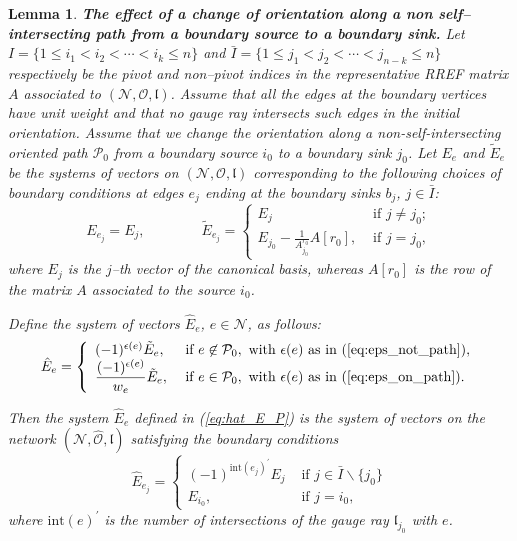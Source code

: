 \documentclass[11pt]{amsart}
\theoremstyle{plain}
\numberwithin{equation}{section}
\newtheorem{lemma}[theorem]{Lemma}
\begin{document}
\begin{lemma}\label{lemma:path}\textbf{The effect of a change of orientation along a non self--intersecting path from a boundary source to a boundary sink.}
Let $I = \{ 1\le i_1 < i_2 < \cdots < i_k\le n\}$ and $\bar I = \{ 1\le j_1 < j_2 < \cdots < j_{n-k}\le n\}$ respectively be the pivot and non--pivot indices in the representative RREF matrix $A$ associated to $({\mathcal N},\mathcal O,\mathfrak l)$. Assume that all the edges at the boundary vertices have unit weight and that no gauge ray intersects such edges in the initial orientation. 
Assume that we change the orientation  along a non-self-intersecting oriented path $\mathcal P_0$ from a boundary source $i_0$ to a 
boundary sink $j_0$. Let $E_e$ and $\tilde E_e$ be the systems of vectors on $({\mathcal N},\mathcal O,\mathfrak l)$ corresponding to the following choices of boundary conditions at edges $e_j$ ending at the boundary sinks $b_j$, $j\in \bar I$:
\begin{equation}
\label{eq:orient1}
E_{e_{j}}=E_{j}, \quad\quad\quad\quad
\tilde E_{e_{j}}= \left\{ \begin{array}{ll} E_{j} & \mbox{ if } j\not = j_0;\\
E_{j_0}-\frac{1}{A^{r_0}_{j_0}} A[r_0], &\mbox{ if } j = j_0,
\end{array}
\right.
\end{equation}
where $E_{j}$ is the $j$--th vector of the canonical basis, whereas $A[r_0]$ is the row of the matrix $A$ associated to the source $i_0$.

Define the system of vectors $\hat E_e$,  $e\in {\mathcal N}$, as follows: 
\begin{equation}\label{eq:hat_E_P}
{\hat E}_e = \left\{ \begin{array}{ll}
 (-1)^{\epsilon(e)} {\tilde E}_e, & \mbox{ if } e\not \in \mathcal P_0, \mbox{ with } \epsilon(e) \mbox{ as in (\ref{eq:eps_not_path})},\\
\displaystyle \frac{(-1)^{\epsilon(e)}}{w_e} {\tilde E}_e, & \mbox{ if } e\in \mathcal P_0, \mbox{ with } \epsilon(e) \mbox{ as in (\ref{eq:eps_on_path})}.
\end{array}\right.
\end{equation}

Then the system $\hat E_e$ defined in (\ref{eq:hat_E_P}) is the system of vectors on the network $({\mathcal N},{\hat {\mathcal O}},\mathfrak l)$ satisfying the boundary conditions
\begin{equation}
\label{eq:orient2}
\hat E_{e_{j}}= \left\{ \begin{array}{ll} (-1)^{\mbox{int} (e_j)^{\prime}} E_{j} & \mbox{ if } j\in \bar I \backslash \{ j_0\}\\
E_{i_0}, &\mbox{ if } j = i_0,
\end{array}
\right.
\end{equation}
where $\mbox{int}(e)^{\prime}$ is the number of intersections of the gauge ray $\mathfrak{l}_{j_0}$  with $e$.
\end{lemma}
\end{document}
